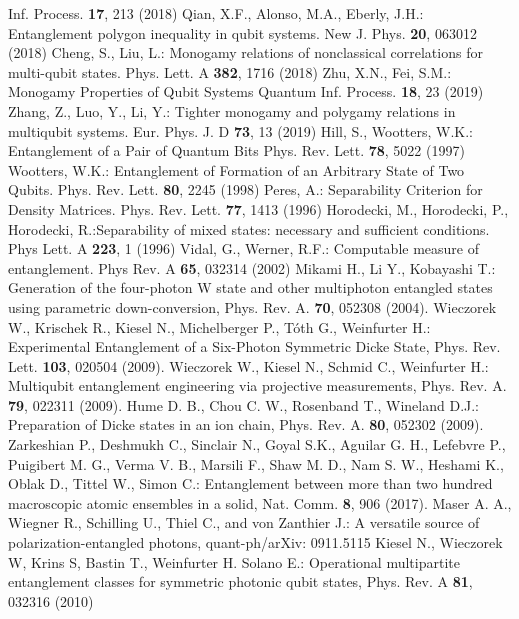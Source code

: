 \documentclass[pra,a4paper,showpacs,superscriptaddress]{revtex4}
\begin{document}
\begin{thebibliography}{50}
Inf. Process. {\bf 17}, 213 (2018)
  Qian, X.F., Alonso, M.A., Eberly, J.H.: 
Entanglement polygon inequality in qubit systems.
New J. Phys. {\bf 20}, 063012 (2018)
 Cheng, S., Liu, L.: Monogamy relations of 
nonclassical correlations for multi-qubit states. Phys. Lett. A 
{\bf 382}, 1716 (2018)
  Zhu, X.N., Fei, S.M.: Monogamy Properties of 
Qubit Systems  	
Quantum Inf. Process. {\bf 18}, 23 (2019)
 Zhang, Z., Luo, Y., Li, Y.: Tighter monogamy and 
polygamy relations in multiqubit systems. Eur. Phys. J. D {\bf 73}, 13
(2019)
 Hill, S., Wootters, W.K.: Entanglement of a Pair of 
Quantum Bits  Phys. Rev. Lett. 
{\bf 78}, 5022 (1997)
 Wootters, W.K.: Entanglement of Formation of an 
Arbitrary State of Two Qubits.  Phys. Rev. Lett. {\bf 80}, 2245 (1998)
 Peres, A.: Separability Criterion for Density 
Matrices. Phys. Rev. Lett. {\bf 77}, 1413 (1996)
 Horodecki, M., Horodecki, P., Horodecki, 
R.:Separability of mixed states: necessary and sufficient conditions. 
Phys 
Lett. A {\bf 223}, 1 (1996)
 Vidal, G., Werner, R.F.: Computable measure of 
entanglement.  Phys Rev. A {\bf 65},
032314 (2002)
   Mikami H., Li Y., Kobayashi T.: Generation of the 
four-photon W state and other multiphoton entangled states
using parametric down-conversion, Phys. Rev. A.
{\bf 70}, 052308 (2004).  
  Wieczorek W., Krischek R., Kiesel N., Michelberger P.,
  T{\'o}th G., Weinfurter H.: Experimental Entanglement of a 
  Six-Photon Symmetric Dicke State, Phys. Rev. Lett. {\bf 103},	
  020504 (2009). 
  Wieczorek W., Kiesel N.,  Schmid C., Weinfurter 
H.: Multiqubit entanglement engineering via projective measurements,
Phys. Rev. A. {\bf 79}, 022311 (2009). 
 Hume D. B.,  Chou C. W.,  Rosenband T., Wineland 
D.J.: Preparation of Dicke states in an ion chain, Phys. Rev. A. 
{\bf80}, 052302 (2009).
   Zarkeshian P., Deshmukh C.,  Sinclair N.,  
Goyal S.K., Aguilar G. H., Lefebvre P., Puigibert M. G., Verma V. 
B.,  Marsili F., Shaw M. D.,  Nam S. W.,  Heshami K.,  Oblak D.,  
Tittel W., Simon C.: Entanglement between more than two hundred
macroscopic atomic ensembles in a solid, Nat. Comm. {\bf 8}, 906 
(2017). 
  Maser A. A.,  Wiegner R.,  Schilling U.,  Thiel C., and  von Zanthier J.: A versatile source of polarization-entangled photons,  quant-ph/arXiv: 0911.5115
 Kiesel N.,  Wieczorek W,  Krins S,  Bastin T.,  Weinfurter H.  Solano E.: Operational multipartite entanglement classes for symmetric photonic qubit states, Phys. Rev. A {\bf 81}, 032316 (2010) 

\end{thebibliography}
\end{document}
